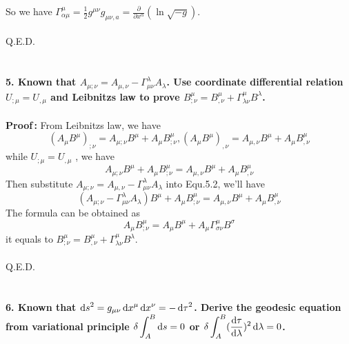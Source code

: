 \documentclass[12pt]{article}
\begin{document}
So we have $\displaystyle \Gamma^{\mu}_{\alpha\mu}=\frac{1}{2}g^{\mu\nu}g_{\mu\nu,a}=\frac{\partial}{\partial x^{\alpha}}(\ln\sqrt{-g})$.\\
~\\
Q.E.D.
~\\
~\\
~\\
\textbf{5. Known that $\displaystyle A_{\mu;\nu}=A_{\mu,\nu}-\Gamma^{\lambda}_{\mu\nu}A_{\lambda}$. Use coordinate differential relation $\displaystyle U_{;\mu}=U_{,\mu}$ and Leibnitzs law to prove $B^{\mu}_{;\nu}=B^{\mu}_{,\nu}+\Gamma^{\mu}_{\lambda\nu}B^{\lambda}$.} \\		
~\\
\textbf{Proof\,:}
From Leibnitzs law, we have
\begin{equation}
\displaystyle 
(A_{\mu}B^{\mu})_{;\nu}=A_{\mu;\nu}B^{\mu}+A_{\mu}B^{\mu}_{;\nu}, (A_{\mu}B^{\mu})_{,\nu}=A_{\mu,\nu}B^{\mu}+A_{\mu}B^{\mu}_{,\nu}
	\tag{5.1}
\end{equation}
while $\displaystyle U_{;\mu}=U_{,\mu}$ , we have
\begin{equation}
\displaystyle 
A_{\mu;\nu}B^{\mu}+A_{\mu}B^{\mu}_{;\nu}=A_{\mu,\nu}B^{\mu}+A_{\mu}B^{\mu}_{,\nu}
	\tag{5.2}
\end{equation}
Then substitute $\displaystyle A_{\mu;\nu}=A_{\mu,\nu}-\Gamma^{\lambda}_{\mu\nu}A_{\lambda}$ into Equ.5.2, we'll have
\begin{equation}
\displaystyle 
(A_{\mu;\nu}-\Gamma^{\lambda}_{\mu\nu}A_{\lambda})B^{\mu}+A_{\mu}B^{\mu}_{;\nu}=A_{\mu,\nu}B^{\mu}+A_{\mu}B^{\mu}_{,\nu}
	\tag{5.3}
\end{equation}
The formula can be obtained as
\begin{equation}
\displaystyle 
A_{\mu}B^{\mu}_{;\nu}=A_{\mu}B^{\mu}+A_{\mu}\Gamma^{\mu}_{\sigma\nu}B^{\sigma}
	\tag{5.4}
\end{equation}
it equals to $B^{\mu}_{;\nu}=B^{\mu}_{,\nu}+\Gamma^{\mu}_{\lambda\nu}B^{\lambda}$.\\
~\\
Q.E.D.
~\\
~\\
~\\
\textbf{6. Known that $\displaystyle \mathop{}\!\mathrm{d} s^{2}=g_{\mu\nu}\mathop{}\!\mathrm{d} x^{\mu}\mathop{}\!\mathrm{d} x^{\nu}=-\mathop{}\!\mathrm{d}\tau^{2}$. Derive the geodesic equation from variational principle $\displaystyle \delta\int_{A}^{B}\mathop{}\!\mathrm{d} s=0$ or $\displaystyle \delta\int_{A}^{B}(\frac{\mathop{}\!\mathrm{d}\tau}{\mathop{}\!\mathrm{d}\lambda})^{2}\mathop{}\!\mathrm{d}\lambda=0$.} \\	
~\\
\end{document}
